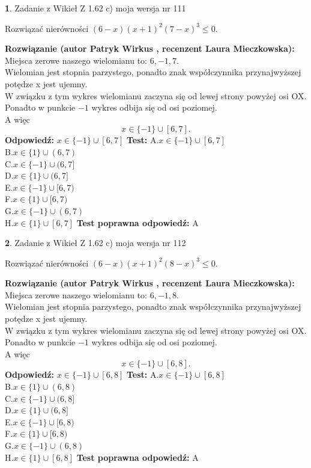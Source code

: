 \documentclass[12pt, a4paper]{article}
\theoremstyle{definition} %
\newtheorem{zad}{}
\newcommand{\zadStart}[1]{\begin{zad}#1\newline}
\newcommand{\zadStop}{\end{zad}}
\newcommand{\rozwStart}[2]{\noindent \textbf{Rozwiązanie (autor #1 , recenzent #2): }\newline}
\newcommand{\rozwStop}{\newline}
\newcommand{\odpStart}{\noindent \textbf{Odpowiedź:}\newline}
\newcommand{\odpStop}{\newline}
\newcommand{\testStart}{\noindent \textbf{Test:}\newline}
\newcommand{\testStop}{\newline}
\newcommand{\kluczStart}{\noindent \textbf{Test poprawna odpowiedź:}\newline}
\newcommand{\kluczStop}{\newline}
\begin{document}
\zadStart{Zadanie z Wikieł Z 1.62 c) moja wersja nr 111}

Rozwiązać nierówności $(6-x)(x+1)^{2}(7-x)^{3}\le0$.
\zadStop
\rozwStart{Patryk Wirkus}{Laura Mieczkowska}
Miejsca zerowe naszego wielomianu to: $6, -1, 7$.\\
Wielomian jest stopnia parzystego, ponadto znak współczynnika przy\linebreak najwyższej potędze x jest ujemny.\\ W związku z tym wykres wielomianu zaczyna się od lewej strony powyżej osi OX.\\
Ponadto w punkcie $-1$ wykres odbija się od osi poziomej.\\
A więc $$x \in \{-1\} \cup [6,7].$$
\rozwStop
\odpStart
$x \in \{-1\} \cup [6,7]$
\odpStop
\testStart
A.$x \in \{-1\} \cup [6,7]$\\
B.$x \in \{1\} \cup (6,7)$\\
C.$x \in \{-1\} \cup (6,7]$\\
D.$x \in \{1\} \cup (6,7]$\\
E.$x \in \{-1\} \cup [6,7)$\\
F.$x \in \{1\} \cup [6,7)$\\
G.$x \in \{-1\} \cup (6,7)$\\
H.$x \in \{1\} \cup [6,7]$
\testStop
\kluczStart
A
\kluczStop



\zadStart{Zadanie z Wikieł Z 1.62 c) moja wersja nr 112}

Rozwiązać nierówności $(6-x)(x+1)^{2}(8-x)^{3}\le0$.
\zadStop
\rozwStart{Patryk Wirkus}{Laura Mieczkowska}
Miejsca zerowe naszego wielomianu to: $6, -1, 8$.\\
Wielomian jest stopnia parzystego, ponadto znak współczynnika przy\linebreak najwyższej potędze x jest ujemny.\\ W związku z tym wykres wielomianu zaczyna się od lewej strony powyżej osi OX.\\
Ponadto w punkcie $-1$ wykres odbija się od osi poziomej.\\
A więc $$x \in \{-1\} \cup [6,8].$$
\rozwStop
\odpStart
$x \in \{-1\} \cup [6,8]$
\odpStop
\testStart
A.$x \in \{-1\} \cup [6,8]$\\
B.$x \in \{1\} \cup (6,8)$\\
C.$x \in \{-1\} \cup (6,8]$\\
D.$x \in \{1\} \cup (6,8]$\\
E.$x \in \{-1\} \cup [6,8)$\\
F.$x \in \{1\} \cup [6,8)$\\
G.$x \in \{-1\} \cup (6,8)$\\
H.$x \in \{1\} \cup [6,8]$
\testStop
\kluczStart
A
\kluczStop
\end{document}
